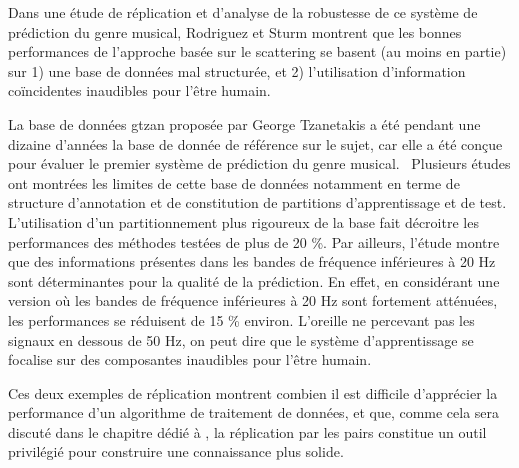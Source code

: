 Dans une étude de réplication et d'analyse de la robustesse de ce système de prédiction du genre musical, Rodriguez et Sturm montrent que les bonnes performances de l'approche basée sur le scattering se basent (au moins en partie) sur 1) une base de données mal structurée, et 2) l'utilisation d'information coïncidentes inaudibles pour l'être humain.~\cite{rodriguez2016analysing}

La base de données gtzan proposée par George Tzanetakis a été pendant une dizaine d'années la base de donnée de référence sur le sujet, car elle a été conçue pour évaluer le premier système de prédiction du genre musical.~\cite{tzanetakis2002musical} Plusieurs études ont montrées les limites de cette base de données notamment en terme de structure d'annotation et de constitution de partitions d'apprentissage et de test. L'utilisation d'un partitionnement plus rigoureux de la base fait décroitre les performances des méthodes testées de plus de 20 \%. Par ailleurs, l'étude montre que des informations présentes dans les bandes de fréquence inférieures à 20 Hz sont déterminantes pour la qualité de la prédiction. En effet, en considérant une version où les bandes de fréquence inférieures à 20 Hz sont fortement atténuées, les performances se réduisent de 15 \% environ. L'oreille ne percevant pas les signaux en dessous de 50 Hz, on peut dire que le système d'apprentissage se focalise sur des composantes inaudibles pour l'être humain.

Ces deux exemples de réplication montrent combien il est difficile d'apprécier la performance d'un algorithme de traitement de données, et que, comme cela sera discuté dans le chapitre dédié à , la réplication par les pairs constitue un outil privilégié pour construire une connaissance plus solide.

